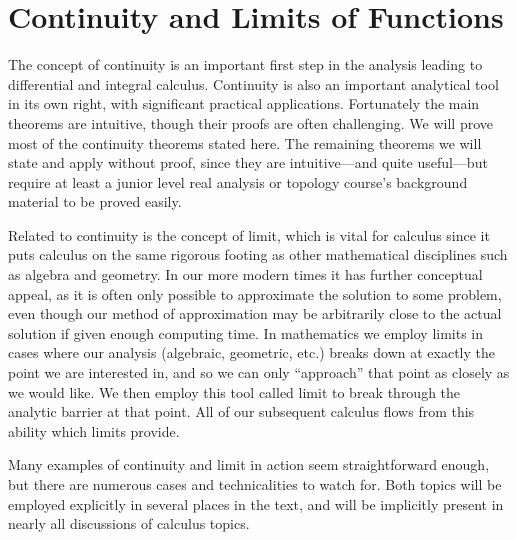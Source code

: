 \setcounter{page}{159}
\chapter{Continuity and Limits of Functions\label{LimitsAndContinuityChapter}} 
The concept of continuity is an important first step in the analysis
leading to differential and integral calculus.  Continuity is
also an important analytical tool in its own right, with significant
practical applications.  Fortunately the main theorems
are intuitive, though their proofs are often challenging.
We will prove most of the continuity theorems stated here.
The remaining theorems we will state and apply without proof, since
they are intuitive---and quite useful---but require at least 
a junior level real analysis or topology course's background material
to be proved easily.


Related to continuity is the concept of limit, which
is vital for calculus since it puts calculus
on the same rigorous footing as other mathematical disciplines
such as algebra and geometry.  In our more modern times
it has further conceptual appeal, as it is often only 
possible to approximate
the solution to some problem, even though our method of 
approximation may be arbitrarily close to the actual solution
if given enough computing time.  In mathematics we employ
limits in cases where
our analysis (algebraic, geometric, etc.) breaks down at 
exactly the point we are interested in, and so we can only
``approach'' that point as closely as we would like.  We
then employ this tool called limit to break through the
analytic barrier at that point.  All of our subsequent
calculus flows from this ability which limits provide.


Many examples of continuity and limit in action
seem straightforward  enough, but
there are numerous cases and technicalities to 
watch for. 
%
 Both topics will be employed
explicitly in several places in the text, and will
be implicitly present in nearly all discussions of 
calculus topics.









